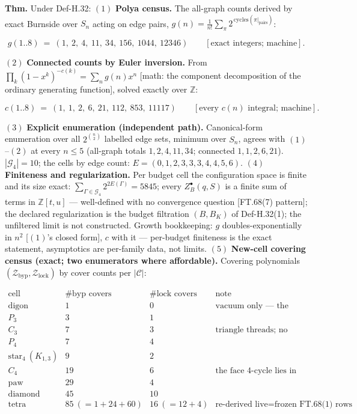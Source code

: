 \begin{theorem}\label{tag:FT-105}
\textbf{Thm.} Under Def-H.32: $(1)$ \textbf{Polya census.} The all-graph counts derived by exact Burnside over $S_n$ acting on edge pairs, $g(n)=\tfrac1{n!}\sum_\pi2^{\,\mathrm{cycles}(\pi|_{\text{pairs}})}$:

\[
g(1..8)\ =\ (1,\ 2,\ 4,\ 11,\ 34,\ 156,\ 1044,\ 12346)\qquad[\text{exact integers; machine}].
\]

$(2)$ \textbf{Connected counts by Euler inversion.} From $\prod_k(1-x^k)^{-c(k)}=\sum_ng(n)x^n$ [math: the component decomposition of the ordinary generating function], solved exactly over $\mathbb Z$:

\[
c(1..8)\ =\ (1,\ 1,\ 2,\ 6,\ 21,\ 112,\ 853,\ 11117)\qquad[\text{every }c(n)\text{ integral; machine}].
\]

$(3)$ \textbf{Explicit enumeration (independent path).} Canonical-form enumeration over all $2^{\binom n2}$ labelled edge sets, minimum over $S_n$, agrees with $(1)$–$(2)$ at every $n\le5$ (all-graph totals $1,2,4,11,34$; connected $1,1,2,6,21$). $|\mathcal G_4|=10$; the cells by edge count: $E=(0,1,2,3,3,3,4,4,5,6)$. $(4)$ \textbf{Finiteness and regularization.} Per budget cell the configuration space is finite and its size exact: $\sum_{\Gamma\in\mathcal G_4}2^{2E(\Gamma)}=5845$; every $Z^{\bullet}_B(q,S)$ is a finite sum of terms in $\mathbb Z[t,u]$ — well-defined with no convergence question [FT.68(7) pattern]; the declared regularization is the budget filtration $(B,B_K)$ of Def-H.32(1); the unfiltered limit is not constructed. Growth bookkeeping: $g$ doubles-exponentially in $n^2$ [$(1)$'s closed form], $c$ with it — per-budget finiteness is the exact statement, asymptotics are per-family data, not limits. $(5)$ \textbf{New-cell covering census (exact; two enumerators where affordable).} Covering polynomials $(\mathcal Z_{\mathrm{byp}},\mathcal Z_{\mathrm{lock}})$ by cover counts per $|\mathcal C|$:

\[
\begin{array}{c|cc|c}
\text{cell}&\#\text{byp covers}&\#\text{lock covers}&\text{note}\\ \hline
\text{digon}&1&0&\text{vacuum only — the digon itself cancels [FT.74(3)]}\\
P_3&3&1&\\
C_3&7&3&\text{triangle threads; no closed triangle is a cover [FT.69(3)(iv)]}\\
P_4&7&4&\\
\mathrm{star}_4\ (K_{1,3})&9&2&\\
C_4&19&6&\text{the face 4-cycle lies in none of its covers [FT.69(3)(v)]}\\
\mathrm{paw}&29&4&\\
\mathrm{diamond}&45&10&\\
\text{tetra}&85\ (=1{+}24{+}60)&16\ (=12{+}4)&\text{re-derived live}=\text{frozen FT.68(1) rows}
\end{array}
\]


\end{theorem}
